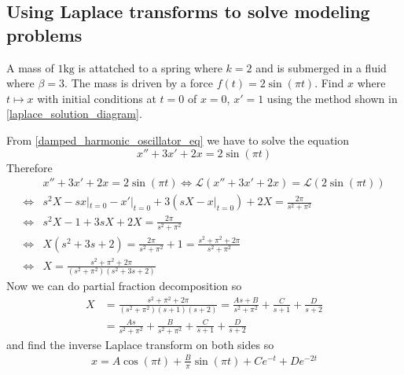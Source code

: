 \documentclass[notes]{subfiles}
\begin{document}
\subsection{Using Laplace transforms to solve modeling problems}
\begin{exercise}
    A mass of $1\si{\kg}$ is attatched to a spring where $k = 2$ and is submerged in a fluid where $\beta = 3$. The mass is driven by a force $f(t) = 2\sin(\pi t)$. Find $x$ where $t \mapsto x$ with initial conditions at $t = 0$ of $x = 0$, $x' = 1$ using the method 
    shown in \cref{laplace_solution_diagram}.
\end{exercise}
\begin{solution}
    From \cref{damped_harmonic_oscillator_eq} we have to solve the equation
    \[
        x'' + 3x' + 2x = 2\sin(\pi t)
    \]
    Therefore
    \begin{align*}
        &x'' + 3x' + 2x = 2\sin(\pi t)
        \iff \mathcal{L}(x'' + 3x' + 2x) = \mathcal{L}(2\sin(\pi t)) \\
        \iff& s^2 X - sx|_{t = 0} - x'|_{t = 0} + 3(sX - x|_{t = 0}) + 2X = \frac{2\pi}{s^2 + \pi^2} \\
        \iff& s^2X - 1 + 3sX + 2X = \frac{2\pi}{s^2 + \pi^2} \\
        \iff& X(s^2 + 3s + 2) = \frac{2\pi}{s^2 + \pi^2} + 1 = \frac{s^2 + \pi^2 + 2\pi}{s^2 + \pi^2} \\
        \iff& X = \frac{s^2 + \pi^2 + 2\pi}{(s^2 + \pi^2)(s^2 + 3s + 2)}
    \end{align*}
    Now we can do partial fraction decomposition so
    \begin{align*}
        X
        &= \frac{s^2 + \pi^2 + 2\pi}{(s^2 + \pi^2)(s + 1)(s + 2)}
        = \frac{As + B}{s^2 + \pi^2} + \frac{C}{s + 1} + \frac{D}{s + 2} \\
        &= \frac{As}{s^2 + \pi^2} + \frac{B}{s^2 + \pi^2} + \frac{C}{s + 1} + \frac{D}{s + 2}
    \end{align*}
    and find the inverse Laplace transform on both sides so
    \begin{align*}
        x = A\cos(\pi t) + \frac{B}{\pi}\sin(\pi t) + Ce^{-t} + De^{-2t}
    \end{align*}
\end{solution}
\end{document}
